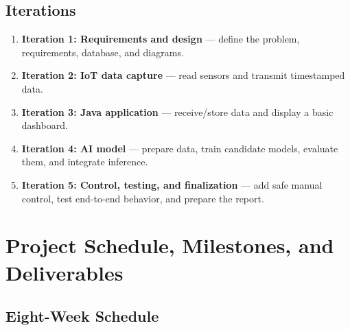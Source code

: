 \documentclass[12pt,a4paper]{report}
\begin{document}
\section{Iterations}

\begin{enumerate}[leftmargin=*]

\item \textbf{Iteration 1: Requirements and design} --- define the problem, requirements, database, and diagrams.

\item \textbf{Iteration 2: IoT data capture} --- read sensors and transmit timestamped data.

\item \textbf{Iteration 3: Java application} --- receive/store data and display a basic dashboard.

\item \textbf{Iteration 4: AI model} --- prepare data, train candidate models, evaluate them, and integrate inference.

\item \textbf{Iteration 5: Control, testing, and finalization} --- add safe manual control, test end-to-end behavior, and prepare the report.

\end{enumerate}

\chapter{Project Schedule, Milestones, and Deliverables}

\section{Eight-Week Schedule}
\end{document}
